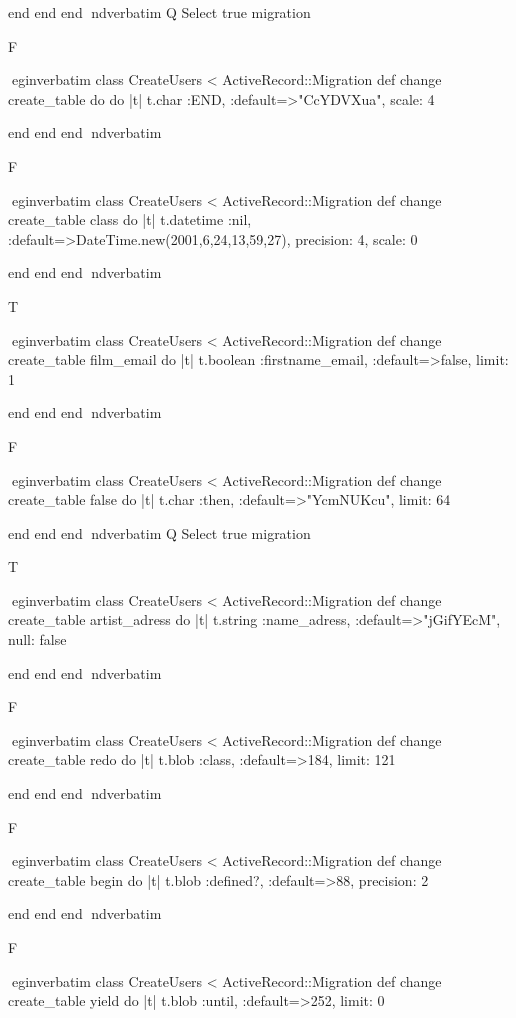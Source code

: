     end 
  end 
end
nd{verbatim}
Q
 Select true migration

F

egin{verbatim}
 class CreateUsers < ActiveRecord::Migration 
  def change 
    create_table do do |t| 
      t.char :END, :default=>"CcYDVXua", scale: 4
    
    end 
  end 
end
nd{verbatim}

F

egin{verbatim}
 class CreateUsers < ActiveRecord::Migration 
  def change 
    create_table class do |t| 
      t.datetime :nil, :default=>DateTime.new(2001,6,24,13,59,27), precision: 4, scale: 0
    
    end 
  end 
end
nd{verbatim}

T

egin{verbatim}
 class CreateUsers < ActiveRecord::Migration 
  def change 
    create_table film_email do |t| 
      t.boolean :firstname_email, :default=>false, limit: 1
    
    end 
  end 
end
nd{verbatim}

F

egin{verbatim}
 class CreateUsers < ActiveRecord::Migration 
  def change 
    create_table false do |t| 
      t.char :then, :default=>"YcmNUKcu", limit: 64
    
    end 
  end 
end
nd{verbatim}
Q
 Select true migration

T

egin{verbatim}
 class CreateUsers < ActiveRecord::Migration 
  def change 
    create_table artist_adress do |t| 
      t.string :name_adress, :default=>"jGifYEcM", null: false
    
    end 
  end 
end
nd{verbatim}

F

egin{verbatim}
 class CreateUsers < ActiveRecord::Migration 
  def change 
    create_table redo do |t| 
      t.blob :class, :default=>184, limit: 121
    
    end 
  end 
end
nd{verbatim}

F

egin{verbatim}
 class CreateUsers < ActiveRecord::Migration 
  def change 
    create_table begin do |t| 
      t.blob :defined?, :default=>88, precision: 2
    
    end 
  end 
end
nd{verbatim}

F

egin{verbatim}
 class CreateUsers < ActiveRecord::Migration 
  def change 
    create_table yield do |t| 
      t.blob :until, :default=>252, limit: 0
    
